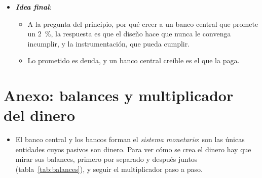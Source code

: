 \documentclass[11pt]{article}
\begin{document}
\begin{itemize}
\begin{itemize}
  \item Sus riesgos están en lo que el modelo canónico deja fuera: el límite inferior, la estabilidad financiera, la dominancia fiscal con deudas altas y unas perturbaciones de oferta cada vez más frecuentes.

  \item Para el riesgo financiero, la regla sigue siendo la de  en 1873: en un pánico, el banco central debe prestar «a un tipo de interés muy alto», «contra todos los buenos valores bancarios y tanto como el público pida».\footnote{En el original: «First. That these loans should only be made at a very high rate of interest. […] Secondly. That at this rate these advances should be made on all good banking securities, and as largely as the public ask for them», en el capítulo~VII de \textcite{Bagehot1873}. La fórmula habitual, «prestar con generosidad, a un tipo de penalización y contra buenas garantías», es un resumen posterior, no una cita literal.}
  \end{itemize}
\item \textbf{\emph{Idea final}}:
  \begin{itemize}
  \item A la pregunta del principio, por qué creer a un banco central que promete un 2~\%, la respuesta es que el diseño hace que nunca le convenga incumplir, y la instrumentación, que pueda cumplir.

  \item Lo prometido es deuda, y un banco central creíble es el que la paga.
  \end{itemize}
\end{itemize}

\clearpage
\appendix

\section{Anexo: balances y multiplicador del dinero}\label{anexo:multiplicador}

\begin{itemize}
\item El banco central y los bancos forman el \emph{sistema monetario}: son las únicas entidades cuyos pasivos son dinero. Para ver cómo se crea el dinero hay que mirar sus balances, primero por separado y después juntos (tabla~\ref{tab:balances}), y seguir el multiplicador paso a paso.
\end{itemize}
\end{document}
